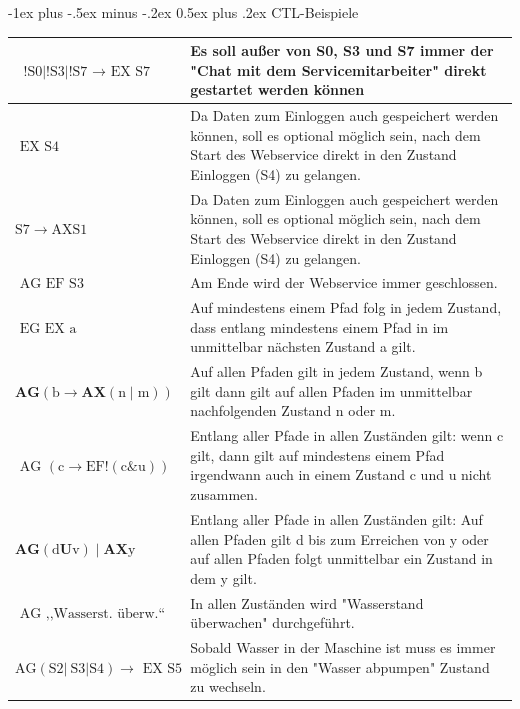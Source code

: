 \documentclass[5pt]{article}
\makeatletter
\renewcommand{\section}{\@startsection{section}{1}{0mm}%
                                {-1ex plus -.5ex minus -.2ex}%
                                {0.5ex plus .2ex}%
                                {\normalfont\large\bfseries}}
\makeatother
\begin{document}
\begin{multicols*}{2}
\section{CTL-Beispiele}
\begin{tabular}{|p{}|p{}|}
    \hline
    $\text { !S0|!S3|!S7 } \rightarrow \text { EX S7 }$ & Es soll außer von S0, S3 und S7 immer der "Chat mit dem Servicemitarbeiter" direkt
    gestartet werden können\\
    \hline
    $\text { EX S4 }$ & Da Daten zum Einloggen auch gespeichert werden können, soll es optional möglich
    sein, nach dem Start des Webservice direkt in den Zustand Einloggen (S4) zu
    gelangen.\\
    \hline
    $\mathrm{S} 7 \rightarrow \mathrm{AX} \mathrm{S} 1$ & Da Daten zum Einloggen auch gespeichert werden können, soll es optional möglich
    sein, nach dem Start des Webservice direkt in den Zustand Einloggen (S4) zu
    gelangen.\\
    \hline
    $\text { AG EF S3 }$ & Am Ende wird der Webservice immer geschlossen.\\
    \hline
    $\text { EG EX a }$  & Auf mindestens einem Pfad folg in jedem Zustand, dass entlang mindestens einem Pfad in
    im unmittelbar nächsten Zustand a gilt.\\
    \hline
    $\mathbf{A G}(\mathrm{b} \rightarrow \mathbf{A X}(\mathrm{n} \mid \mathrm{m}))$ &Auf allen Pfaden gilt in jedem Zustand, wenn b gilt dann gilt auf allen Pfaden im unmittelbar nachfolgenden Zustand $\mathrm{n}$ oder $\mathrm{m}$.\\
    \hline
    $\text { AG }(\mathrm{c} \rightarrow \mathrm{EF} !(\mathrm{c} \& \mathrm{u}))$  &Entlang aller Pfade in allen Zuständen gilt: wenn c gilt, dann gilt auf mindestens einem Pfad irgendwann auch in einem Zustand c und u nicht zusammen.\\
    \hline
    $\mathbf{A G}(\mathrm{d} \mathbf{U} \mathrm{v}) \mid \mathbf{A X} \mathrm{y}$&
    Entlang aller Pfade in allen Zuständen gilt: Auf allen Pfaden gilt d bis zum Erreichen von y oder auf allen Pfaden folgt unmittelbar ein Zustand in dem y gilt.\\
    \hline
    $\text { AG ,,Wasserst. überw.“ }$ & In allen Zuständen wird "Wasserstand überwachen" durchgeführt.\\
    \hline
    $\mathrm{AG}(\mathrm{S} 2|\mathrm{~S} 3| \mathrm{S} 4) \rightarrow \text { EX S5 }$ & Sobald Wasser in der Maschine ist muss es immer möglich sein in den "Wasser
    abpumpen" Zustand zu wechseln.\\

\end{tabular}
\end{multicols*}
\end{document}
